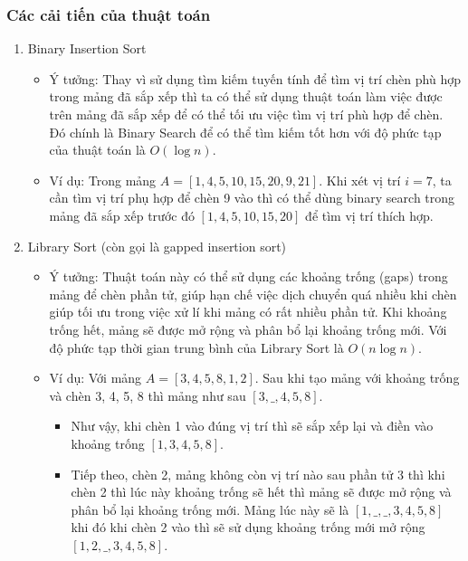 \subsubsection{Các cải tiến của thuật toán}

\begin{enumerate}
    \item Binary Insertion Sort
    \begin{itemize}
        \item Ý tưởng: Thay vì sử dụng tìm kiếm tuyến tính để tìm vị trí 
        chèn phù hợp trong mảng đã sắp xếp thì ta có thể sử dụng thuật 
        toán làm việc được trên mảng đã sắp xếp để có thể tối ưu việc 
        tìm vị trí phù hợp để chèn. Đó chính là Binary Search để có 
        thể tìm kiếm tốt hơn với độ phức tạp của thuật toán là 
        $O\left(\log{n}\right)$.
        \item Ví dụ: Trong mảng $A=\left[1,4,5,10,15,20,9,21\right]$. 
        Khi xét vị trí $i=7$, ta cần tìm vị trí phụ hợp để chèn 9 
        vào thì có thể dùng binary search trong mảng đã sắp xếp trước 
        đó $\left[1,4,5,10,15,20\right]$ để tìm vị trí thích hợp.
    \end{itemize}
    \item Library Sort (còn gọi là gapped insertion sort)
    \begin{itemize}
        \item Ý tưởng: Thuật toán này có thể sử dụng các khoảng trống 
        (gaps) trong mảng để chèn phần tử, giúp hạn chế việc dịch 
        chuyển quá nhiều khi chèn giúp tối ưu trong việc xử lí khi 
        mảng có rất nhiều phần tử. Khi khoảng trống hết, mảng sẽ được 
        mở rộng và phân bổ lại khoảng trống mới. Với độ phức tạp thời 
        gian trung bình của Library Sort là $O\left(n\log{n}\right)$.
        \item Ví dụ: Với mảng $A=\left[3,4,5,8,1,2\right]$. Sau khi 
        tạo mảng với khoảng trống và chèn 3, 4, 5, 8 thì mảng 
        như sau $\left[3,\_,4,5,8\right]$.
        \begin{itemize}[label=$\circ$]
            \item Như vậy, khi chèn 1 vào đúng vị trí thì sẽ sắp xếp 
            lại và điền vào khoảng trống $\left[1,3,4,5,8\right]$.
            \item Tiếp theo, chèn 2, mảng không còn vị trí nào sau 
            phần tử 3 thì khi chèn 2 thì lúc này khoảng trống sẽ hết 
            thì mảng sẽ được mở rộng và phân bổ lại khoảng trống mới. 
            Mảng lúc này sẽ là $\left[1,\_,\_,3,4,5,8\right]$ khi đó 
            khi chèn 2 vào thì sẽ sử dụng khoảng trống mới mở rộng 
            $\left[1,2,\_,3,4,5,8\right]$.
        \end{itemize}
    \end{itemize}
\end{enumerate}